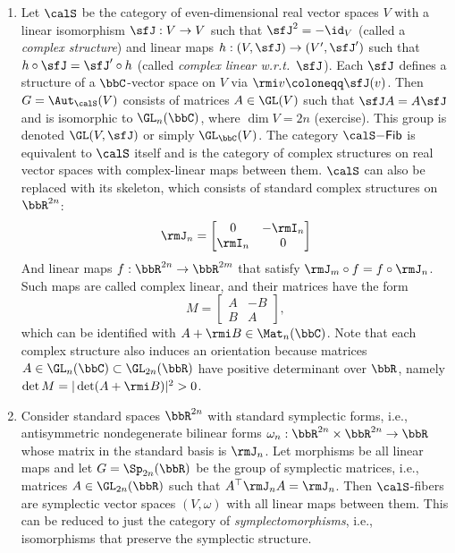 \begin{example}
\begin{enumerate}
        \item Let $\calS$ be the category of even-dimensional real vector spaces $V$ with a linear isomorphism $\sfJ:V\to V$ such that $\sfJ^2=-\id_V$ (called a \emph{complex structure}) and linear maps $h:(V,\sfJ)\to(V',\sfJ')$ such that $h\circ \sfJ=\sfJ'\circ h$ (called \emph{complex linear w.r.t.\ $\sfJ$}). Each $\sfJ$ defines a structure of a $\bbC$-vector space on $V$ via $\rmi v\coloneqq\sfJ(v)$. Then $G=\Aut_\calS(V)$ consists of matrices $A\in\GL(V)$ such that $\sfJ A=A\sfJ$ and is isomorphic to $\GL_n(\bbC)$, where $\dim V=2n$ (exercise). This group is denoted $\GL(V,\sfJ)$ or simply $\GL_\bbC(V)$. The category $\calS\mathsf{-Fib}$ is equivalent to $\calS$ itself and is the category of complex structures on real vector spaces with complex-linear maps between them. $\calS$ can also be replaced with its skeleton, which consists of standard complex structures on $\bbR^{2n}$:
        \[\rmJ_{n}=\begin{bmatrix}
            0&-\rmI_n\\
            \rmI_n&0
        \end{bmatrix}\]
        And linear maps $f:\bbR^{2n}\to \bbR^{2m}$ that satisfy $\rmJ_{m}\circ f=f\circ \rmJ_{n}$. Such maps are called complex linear, and their matrices have the form 
        \[M=\begin{bmatrix}
            A&-B\\
            B&A
        \end{bmatrix},\label{eq complex matrices}\]
        which can be identified with $A+\rmi B\in \Mat_n(\bbC)$.
        Note that each complex structure also induces an orientation because matrices $A\in \GL_n(\bbC)\subset \GL_{2n}(\bbR)$ have positive determinant over $\bbR$, namely $\det M=|\det(A+\rmi B)|^2>0$.

        \item Consider standard spaces $\bbR^{2n}$ with standard symplectic forms, i.e., antisymmetric nondegenerate bilinear forms $\omega_n:\bbR^{2n}\times \bbR^{2n}\to \bbR$ whose matrix in the standard basis is $\rmJ_{n}$. Let morphisms be all linear maps and let $G=\Sp_{2n}(\bbR)$ be the group of symplectic matrices, i.e., matrices $A\in\GL_{2n}(\bbR)$ such that $A^\top\rmJ_{n}A=\rmJ_{n}$. Then $\calS$-fibers are symplectic vector spaces $(V,\omega)$ with all linear maps between them. This can be reduced to just the category of \emph{symplectomorphisms}, i.e., isomorphisms that preserve the symplectic structure.
    \end{enumerate}
\end{example}


